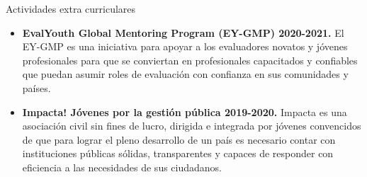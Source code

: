 \documentclass{resume} %
\begin{document}
\begin{rSection}{Actividades extra curriculares} 
\begin{itemize}
    \item 	\textbf{EvalYouth Global Mentoring Program (EY-GMP) 2020-2021.} {El EY-GMP es una iniciativa para apoyar a los evaluadores novatos y jóvenes profesionales para que se conviertan en profesionales capacitados y confiables que puedan asumir roles de evaluación con confianza en sus comunidades y países.}
  \item 	\textbf{Impacta! Jóvenes por la gestión pública 2019-2020.} {Impacta es una asociación civil sin fines de lucro, dirigida e integrada por jóvenes convencidos de que para lograr el pleno desarrollo de un país es necesario contar con instituciones públicas sólidas, transparentes y capaces de responder con eficiencia a las necesidades de sus ciudadanos.}
  \end{itemize}


\end{rSection}
\end{document}
